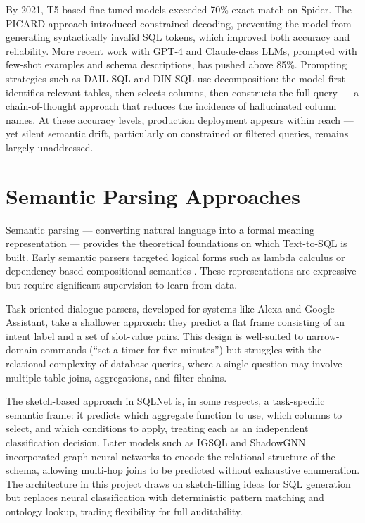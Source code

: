 \documentclass[12pt,a4paper]{report}
\begin{document}
By 2021, T5-based fine-tuned models exceeded 70\% exact match on Spider. The PICARD approach introduced constrained decoding, preventing the model from generating syntactically invalid \ac{SQL} tokens, which improved both accuracy and reliability. More recent work with GPT-4 and Claude-class \acp{LLM}, prompted with few-shot examples and schema descriptions, has pushed above 85\%. Prompting strategies such as DAIL-SQL and DIN-SQL use decomposition: the model first identifies relevant tables, then selects columns, then constructs the full query — a chain-of-thought approach that reduces the incidence of hallucinated column names. At these accuracy levels, production deployment appears within reach — yet silent semantic drift, particularly on constrained or filtered queries, remains largely unaddressed.

\section{Semantic Parsing Approaches}
\label{sec:semantic-parsing}

Semantic parsing — converting natural language into a formal meaning representation — provides the theoretical foundations on which Text-to-SQL is built. Early semantic parsers targeted logical forms such as lambda calculus or dependency-based compositional semantics \cite{seq2sql}. These representations are expressive but require significant supervision to learn from data.

Task-oriented dialogue parsers, developed for systems like Alexa and Google Assistant, take a shallower approach: they predict a flat frame consisting of an intent label and a set of slot-value pairs. This design is well-suited to narrow-domain commands (``set a timer for five minutes'') but struggles with the relational complexity of database queries, where a single question may involve multiple table joins, aggregations, and filter chains.

The sketch-based approach in SQLNet is, in some respects, a task-specific semantic frame: it predicts which aggregate function to use, which columns to select, and which conditions to apply, treating each as an independent classification decision. Later models such as IGSQL and ShadowGNN incorporated graph neural networks to encode the relational structure of the schema, allowing multi-hop joins to be predicted without exhaustive enumeration. The architecture in this project draws on sketch-filling ideas for SQL generation but replaces neural classification with deterministic pattern matching and ontology lookup, trading flexibility for full auditability.
\end{document}
